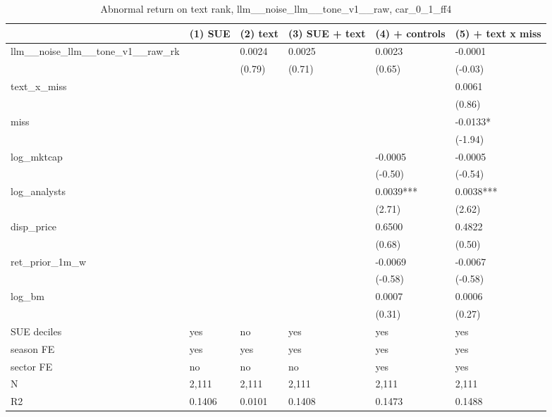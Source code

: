 \begin{table}
\caption{Abnormal return on text rank, llm__noise_llm__tone_v1__raw, car_0_1_ff4}
\label{tab:t8_regressions__llm__noise_llm__tone_v1__raw__car_0_1_ff4__validation}
\begin{tabular}{llllll}
\toprule
 & (1) SUE & (2) text & (3) SUE + text & (4) + controls & (5) + text x miss \\
\midrule
llm\_\_noise\_llm\_\_tone\_v1\_\_raw\_rk &  & 0.0024 & 0.0025 & 0.0023 & -0.0001 \\
 &  & (0.79) & (0.71) & (0.65) & (-0.03) \\
text\_x\_miss &  &  &  &  & 0.0061 \\
 &  &  &  &  & (0.86) \\
miss &  &  &  &  & -0.0133* \\
 &  &  &  &  & (-1.94) \\
log\_mktcap &  &  &  & -0.0005 & -0.0005 \\
 &  &  &  & (-0.50) & (-0.54) \\
log\_analysts &  &  &  & 0.0039*** & 0.0038*** \\
 &  &  &  & (2.71) & (2.62) \\
disp\_price &  &  &  & 0.6500 & 0.4822 \\
 &  &  &  & (0.68) & (0.50) \\
ret\_prior\_1m\_w &  &  &  & -0.0069 & -0.0067 \\
 &  &  &  & (-0.58) & (-0.58) \\
log\_bm &  &  &  & 0.0007 & 0.0006 \\
 &  &  &  & (0.31) & (0.27) \\
SUE deciles & yes & no & yes & yes & yes \\
season FE & yes & yes & yes & yes & yes \\
sector FE & no & no & no & yes & yes \\
N & 2,111 & 2,111 & 2,111 & 2,111 & 2,111 \\
R2 & 0.1406 & 0.0101 & 0.1408 & 0.1473 & 0.1488 \\
\bottomrule
\end{tabular}
\end{table}
